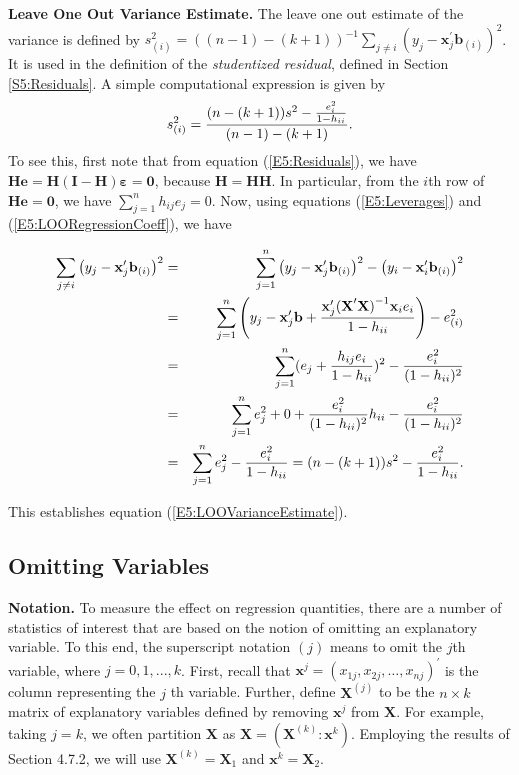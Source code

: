 \textbf{Leave One Out Variance Estimate.} The leave one out estimate
of the variance is defined by
$s_{(i)}^2=((n-1)-(k+1))^{-1}\sum_{j\neq i}\left(
y_j-\mathbf{x}_j^{\prime}\mathbf{b}_{(i)}\right) ^2$. It is used in
the definition of the \textit{studentized residual}, defined in
Section \ref{S5:Residuals}. A simple computational expression is
given by
\begin{equation}\label{E5:LOOVarianceEstimate}
s_{(i)}^2=\frac{(n-(k+1))s^2-\frac{e_i^2}{1-h_{ii}}}{%
(n-1)-(k+1)}.
\end{equation}
To see this, first note that from equation (\ref{E5:Residuals}), we have $\mathbf{He%
}=\mathbf{H(I-H)\boldsymbol \varepsilon}=\mathbf{0}$, because
$\mathbf{H}=\mathbf{HH}$. In
particular, from the $i$th row of $\mathbf{He}=\mathbf{0}$, we have $%
\sum_{j=1}^{n}h_{ij}e_j=0$. Now, using equations
(\ref{E5:Leverages}) and (\ref{E5:LOORegressionCoeff}), we have

\begin{center}
\begin{eqnarray*}
\sum_{j\neq i}\left(
y_j-\mathbf{x}_j^{\prime}\mathbf{b}_{(i)}\right)
^2 &=&\sum_{j=1}^{n}\left( y_j-\mathbf{x}_j^{\prime}\mathbf{b}%
_{(i)}\right) ^2-\left( y_i-\mathbf{x}_i^{\prime}\mathbf{b}%
_{(i)}\right) ^2 \\
&=&\sum_{j=1}^{n}\left( y_j-\mathbf{x}_j^{\prime}\mathbf{b}+\frac{%
\mathbf{x}_j^{\prime}\mathbf{(X}^{\prime}\mathbf{X)}^{-1}\mathbf{x}_i%
e_i}{1-h_{ii}}\right) -e_{(i)}^2 \\
&=&\sum_{j=1}^{n}(e_j+\frac{h_{ij}e_i}{1-h_{ii}})^2-\frac{%
e_i^2}{(1-h_{ii})^2} \\
&=&\sum_{j=1}^{n}e_j^2+0+\frac{e_i^2}{(1-h_{ii})^2}%
h_{ii}-\frac{e_i^2}{(1-h_{ii})^2} \\
&=&\sum_{j=1}^{n}e_j^2-\frac{e_i^2}{1-h_{ii}}%
=(n-(k+1))s^2-\frac{e_i^2}{1-h_{ii}}.
\end{eqnarray*}%
\qquad
\end{center}

This establishes equation (\ref{E5:LOOVarianceEstimate}).

\subsection{Omitting Variables}\label{S5:OmittingVariables}

\textbf{Notation.} To measure the effect on regression quantities,
there are a number of statistics of interest that are based on the
notion of omitting an explanatory variable. To this end, the
superscript notation $(j)$ means to omit the $j$th variable, where
$j=0,1,...,k$. First, recall that
$\mathbf{x}^{j}=(x_{1j},x_{2j},\ldots,x_{nj})^{\prime}$ is the
column representing the $j$ th variable. Further, define
$\mathbf{X}^{(j)}$ to be the $n\times k$ matrix of explanatory
variables defined by removing $\mathbf{x}^{j}$ from $\mathbf{X}$.
For example, taking $j=k$, we often partition $\mathbf{X}$ as
$\mathbf{X} =\left( \mathbf{X}^{(k)}: \mathbf{x}^k \right) $.
Employing the results of Section 4.7.2, we will use
$\mathbf{X}^{(k)} = \mathbf{X}_1$ and $\mathbf{x}^k =
\mathbf{X}_2.$


